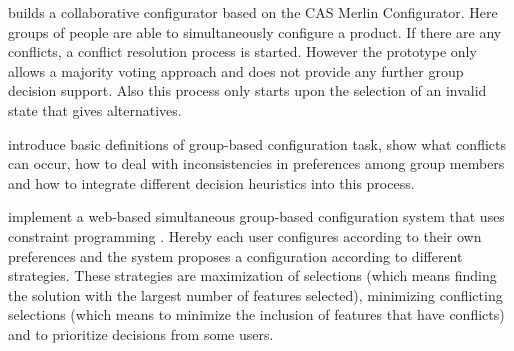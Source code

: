 \begin{description}[style=unboxed, leftmargin=0cm, font=\normalfont]
    \item[\citeauthor{raabKollaborativeProduktkonfigurationEchtzeit2019} \cite{raabKollaborativeProduktkonfigurationEchtzeit2019}] builds a collaborative configurator based on the CAS Merlin Configurator. Here groups of people are able to simultaneously configure a product. If there are any conflicts, a conflict resolution process is started. However the prototype only allows a majority voting approach and does not provide any further group decision support. Also this process only starts upon the selection of an invalid state that gives alternatives.

    \item[\citeauthor{felferningGroupBasedConfiguration2016} \cite{felferningGroupBasedConfiguration2016}] introduce basic definitions of group-based configuration task, show what conflicts can occur, how to deal with inconsistencies in preferences among group members and how to integrate different decision heuristics into this process.

    \item[\citeauthor{velasquez-guevaraMultiSPLOTSupportingMultiuser2018} \cite{velasquez-guevaraMultiSPLOTSupportingMultiuser2018}] implement a web-based simultaneous group-based configuration system that uses constraint programming . Hereby each user configures according to their own preferences and the system proposes a configuration according to different strategies. These strategies are maximization of selections (which means finding the solution with the largest number of features selected), minimizing conflicting selections (which means to minimize the inclusion of features that have conflicts) and to prioritize decisions from some users.
\end{description}

